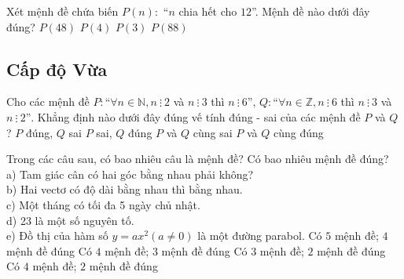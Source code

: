 \begin{ex}%
	Xét mệnh đề chứa biến $P(n):$ “$n$ chia hết cho $12$”. Mệnh đề nào dưới đây đúng?
	\choice 
	{\True $P(48)$} 
	{ $P(4) $} 
	{ $P(3)$} 
	{ $P(88)$} 
\end{ex}

\subsection*{Cấp độ Vừa}
\begin{ex}%
	Cho các mệnh đề $P:“\forall n\in \mathbb{N},n~\vdots ~2$ và $n~\vdots ~3$ thì $n~\vdots ~ 6”$,  $Q:“\forall n\in \mathbb{Z},n~\vdots ~6$ thì $n~\vdots ~3$ và $n~\vdots ~2”$.
	Khẳng định nào dưới đây đúng vế tính đúng - sai của các mệnh đề $P$ và $Q$?
	\choice 
	{ $P$ đúng, $Q$ sai} 
	{ $P$ sai, $Q$ đúng} 
	{ $P$ và $Q$ cùng sai} 
	{ \True $P$ và $Q$ cùng đúng}
\end{ex}

\begin{ex}%
	Trong các câu sau, có bao nhiêu câu là mệnh đề? Có bao nhiêu mệnh đề đúng?\\
	a)  Tam giác cân có hai góc bằng nhau phải không?\\
	b) Hai vectơ có độ dài bằng nhau thì bằng nhau.\\
	c) Một tháng có tối đa 5 ngày chủ nhật.\\
	d) 23 là một số nguyên tố.\\
	e) Đồ thị của hàm số $y=ax^2(a \ne 0)$ là một đường parabol.
	\choice
	{Có $5$ mệnh đề; $4$ mệnh đề đúng}
	{\True Có $4$ mệnh đề; $3$ mệnh đề đúng}
	{Có $3$ mệnh đề; $2$ mệnh đề đúng}
	{Có $4$ mệnh đề; $2$ mệnh đề đúng}
\end{ex}



